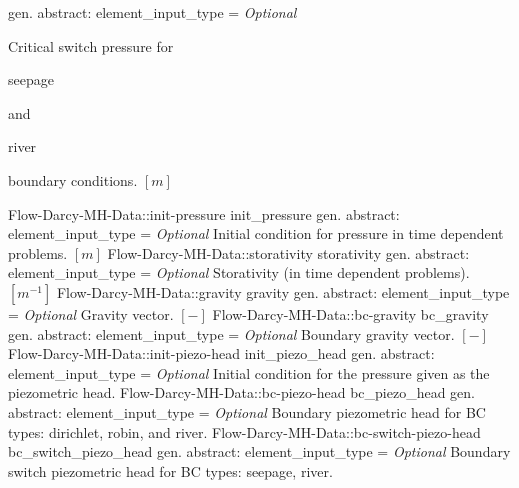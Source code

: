 \begin{RecordType}
			{{gen. abstract: }}{{element{\_}input{\_}type}{ = }}
			{ \it{Optional}}
			{{{Critical switch pressure for }\begin{ttfamily}seepage\end{ttfamily}{ and }\begin{ttfamily}river\end{ttfamily}{ boundary conditions. }{$[m]$}%
}}
		\RecKey
			{Flow-Darcy-MH-Data::init-pressure}
			{init{\_}pressure}
			{{gen. abstract: }}{{element{\_}input{\_}type}{ = }}
			{ \it{Optional}}
			{{{Initial condition for pressure in time dependent problems. }{$[m]$}%
}}
		\RecKey
			{Flow-Darcy-MH-Data::storativity}
			{storativity}
			{{gen. abstract: }}{{element{\_}input{\_}type}{ = }}
			{ \it{Optional}}
			{{{Storativity (in time dependent problems). }{$[m^{-1}]$}%
}}
		\RecKey
			{Flow-Darcy-MH-Data::gravity}
			{gravity}
			{{gen. abstract: }}{{element{\_}input{\_}type}{ = }}
			{ \it{Optional}}
			{{{Gravity vector. }{$[-]$}%
}}
		\RecKey
			{Flow-Darcy-MH-Data::bc-gravity}
			{bc{\_}gravity}
			{{gen. abstract: }}{{element{\_}input{\_}type}{ = }}
			{ \it{Optional}}
			{{{Boundary gravity vector. }{$[-]$}%
}}
		\RecKey
			{Flow-Darcy-MH-Data::init-piezo-head}
			{init{\_}piezo{\_}head}
			{{gen. abstract: }}{{element{\_}input{\_}type}{ = }}
			{ \it{Optional}}
			{{{Initial condition for the pressure given as the piezometric head.}%
}}
		\RecKey
			{Flow-Darcy-MH-Data::bc-piezo-head}
			{bc{\_}piezo{\_}head}
			{{gen. abstract: }}{{element{\_}input{\_}type}{ = }}
			{ \it{Optional}}
			{{{Boundary piezometric head for BC types: dirichlet, robin, and river.}%
}}
		\RecKey
			{Flow-Darcy-MH-Data::bc-switch-piezo-head}
			{bc{\_}switch{\_}piezo{\_}head}
			{{gen. abstract: }}{{element{\_}input{\_}type}{ = }}
			{ \it{Optional}}
			{{{Boundary switch piezometric head for BC types: seepage, river.}%
}}
\end{RecordType}
